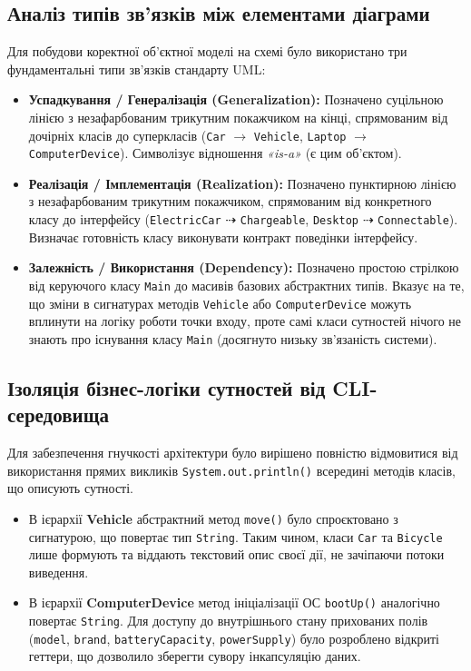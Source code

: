 \subsection{Аналіз типів зв'язків між елементами діаграми}
Для побудови коректної об'єктної моделі на схемі було використано три фундаментальні типи 
зв'язків стандарту UML:
\begin{itemize}
    \item \textbf{Успадкування / Генералізація (Generalization):} 
    Позначено суцільною лінією з незафарбованим трикутним покажчиком на кінці, спрямованим 
    від дочірніх класів до суперкласів (\texttt{Car} $\rightarrow$ \texttt{Vehicle}, 
    \texttt{Laptop} $\rightarrow$ \texttt{ComputerDevice}). Символізує відношення 
    \textit{«is-a»} (є цим об'єктом).
    \item \textbf{Реалізація / Імплементація (Realization):} Позначено пунктирною лінією з 
    незафарбованим трикутним покажчиком, спрямованим від конкретного класу до інтерфейсу 
    (\texttt{ElectricCar} $\dashrightarrow$ \texttt{Chargeable}, \texttt{Desktop}
     $\dashrightarrow$ \texttt{Connectable}). Визначає готовність класу виконувати 
     контракт поведінки інтерфейсу.
    \item \textbf{Залежність / Використання (Dependency):} Позначено простою стрілкою 
    від керуючого класу \texttt{Main} до масивів базових абстрактних типів. Вказує на 
    те, що зміни в сигнатурах методів \texttt{Vehicle} або \texttt{ComputerDevice} можуть 
    вплинути на логіку роботи точки входу, проте самі класи сутностей нічого не знають про
     існування класу \texttt{Main} (досягнуто низьку зв'язаність системи).
\end{itemize}

\subsection{Ізоляція бізнес-логіки сутностей від CLI-середовища}

Для забезпечення гнучкості архітектури було вирішено повністю відмовитися від 
використання прямих викликів \texttt{System.out.println()} всередині методів 
класів, що описують сутності. 

\begin{itemize}
    \item В ієрархії \textbf{Vehicle} абстрактний метод \texttt{move()} було 
    спроєктовано з сигнатурою, що повертає тип \texttt{String}. Таким чином, 
    класи \texttt{Car} та \texttt{Bicycle} лише формують та віддають текстовий 
    опис своєї дії, не зачіпаючи потоки виведення.
    \item В ієрархії \textbf{ComputerDevice} метод ініціалізації ОС \texttt{bootUp()} 
    аналогічно повертає \texttt{String}. Для доступу до внутрішнього стану 
    прихованих полів (\texttt{model}, \texttt{brand}, \texttt{batteryCapacity}, 
    \texttt{powerSupply}) було розроблено відкриті геттери, що дозволило зберегти 
    сувору інкапсуляцію даних.
\end{itemize}

